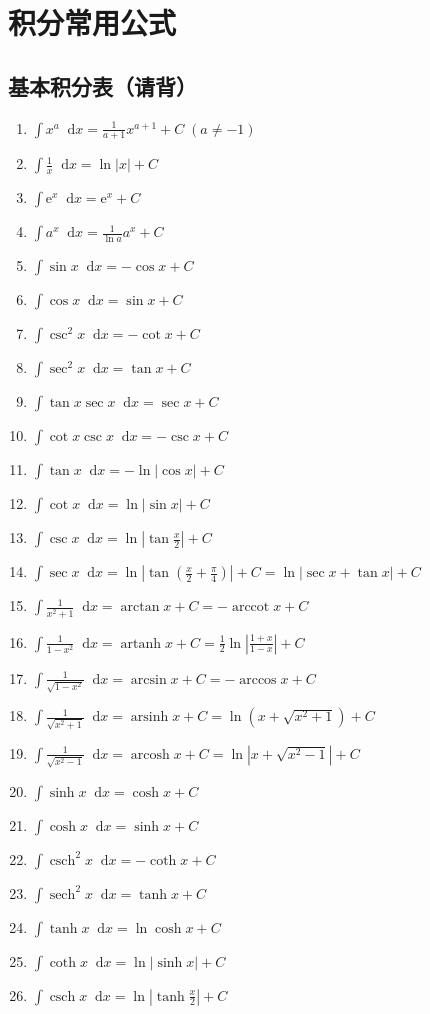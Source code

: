 \documentclass{ctexbook}
\DeclareMathOperator{\sech}{sech}
\DeclareMathOperator{\csch}{csch}
\DeclareMathOperator{\arccot}{arccot}
\DeclareMathOperator{\arsinh}{arsinh}
\DeclareMathOperator{\arcosh}{arcosh}
\DeclareMathOperator{\artanh}{artanh}
\newcommand{\e}{\mathrm{e}}
\newcommand*{\dif}{\mathop{}\!\mathrm{d}}
\begin{document}
\chapter{积分常用公式}
\section{基本积分表（请背）}
\begin{enumerate}
	\item$\int x^{a}\dif{x}=\frac{1}{a+1}x^{a+1}+C\;\left(a\ne-1\right)$
	\item$\int\frac{1}{x}\dif{x}=\ln{\left|x\right|}+C$
	\item$\int\e^{x}\dif{x}=\e^{x}+C$
	\item$\int a^{x}\dif{x}=\frac{1}{\ln{a}}a^{x}+C$
	\item$\int\sin{x}\dif{x}=-\cos{x}+C$
	\item$\int\cos{x}\dif{x}=\sin{x}+C$
	\item$\int\csc^{2}{x}\dif{x}=-\cot{x}+C$
	\item$\int\sec^{2}{x}\dif{x}=\tan{x}+C$
	\item$\int\tan{x}\sec{x}\dif{x}=\sec{x}+C$
	\item$\int\cot{x}\csc{x}\dif{x}=-\csc{x}+C$
	\item$\int\tan{x}\dif{x}=-\ln{\left|\cos{x}\right|}+C$
	\item$\int\cot{x}\dif{x}=\ln{\left|\sin{x}\right|}+C$
	\item$\int\csc{x}\dif{x}=\ln{\left|\tan{\frac{x}{2}}\right|}+C$
	\item$\int\sec{x}\dif{x}=\ln{\left|\tan{\left(\frac{x}{2}+\frac{\pi}{4}\right)}\right|}+C=\ln{\left|\sec{x}+\tan{x}\right|}+C$
	\item$\int\frac{1}{x^{2}+1}\dif{x}=\arctan{x}+C=-\arccot{x}+C$
	\item$\int\frac{1}{1-x^{2}}\dif{x}=\artanh{x}+C=\frac{1}{2}\ln{\left|\frac{1+x}{1-x}\right|}+C$
	\item$\int\frac{1}{\sqrt{1-x^{2}}}\dif{x}=\arcsin{x}+C=-\arccos{x}+C$
	\item$\int\frac{1}{\sqrt{x^{2}+1}}\dif{x}=\arsinh{x}+C=\ln{\left(x+\sqrt{x^{2}+1}\right)}+C$
	\item$\int\frac{1}{\sqrt{x^{2}-1}}\dif{x}=\arcosh{x}+C=\ln{\left|x+\sqrt{x^{2}-1}\right|}+C$
	\item$\int\sinh{x}\dif{x}=\cosh{x}+C$
	\item$\int\cosh{x}\dif{x}=\sinh{x}+C$
	\item$\int\csch^{2}{x}\dif{x}=-\coth{x}+C$
	\item$\int\sech^{2}{x}\dif{x}=\tanh{x}+C$
	\item$\int\tanh{x}\dif{x}=\ln{\cosh{x}}+C$
	\item$\int\coth{x}\dif{x}=\ln{\left|\sinh{x}\right|}+C$
	\item$\int\csch{x}\dif{x}=\ln{\left|\tanh{\frac{x}{2}}\right|}+C$
\end{enumerate}
\end{document}
